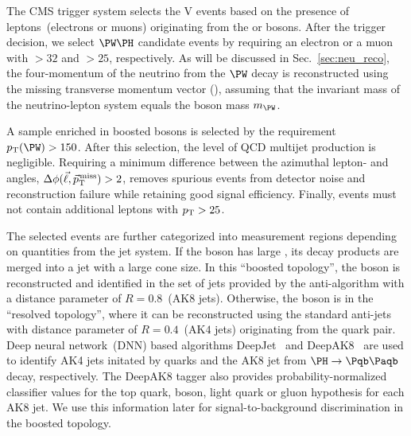 \documentclass[a4paper,11pt]{article}
\newcommand{\Pb}{{{\Pqb}}\xspace}
\newcommand{\PAb}{{{{\Paqb}}}\xspace}
\renewcommand{\PV}{{{{V}}}\xspace}
\newcommand{\VH}{{{\PV}{\PH}}\xspace}
\begin{document}
The CMS trigger system selects the \VH events based on the presence of leptons~(electrons or muons) originating from the \PW or \PZ bosons.
After the trigger decision, we select $\PW\PH$ candidate events by requiring an electron or a muon with \pt$>32$ and $>25$\GeV, respectively. 
As will be discussed in Sec.~\ref{sec:neu_reco}, the four-momentum of the neutrino from the $\PW$ decay is reconstructed using the missing transverse momentum vector (\ptvecmiss), assuming that the invariant mass of the neutrino-lepton system equals the \PW boson mass $m_{\PW}$.

A sample enriched in boosted \PW bosons is selected by the requirement $\pt(\PW) > 150$\GeV. 
After this selection, the level of QCD multijet production is negligible.
Requiring a minimum difference between the azimuthal lepton- and \ptmiss angles, $\Delta\phi(\vec{\ell},{\vec p}_{\mathrm{T}}^{\kern1pt\text{miss}})>2$, removes spurious events from detector noise and reconstruction failure while retaining good signal efficiency.
Finally, %
events must not contain additional leptons with $p_{\mathrm{T}}>25$\GeV.

The selected events are further categorized into measurement regions depending on quantities from the jet system. 
If the \PH boson has large \pt, its decay products are merged into a jet with a large cone size. 
In this ``boosted topology'', the \PH boson is reconstructed and identified in the set of jets provided by the anti-\kt algorithm with a distance parameter of $R=0.8$~(AK8 jets).
Otherwise, the \PH boson is in the ``resolved topology'', 
where it can be reconstructed using the standard anti-\kt jets with distance parameter of $R=0.4$~(AK$4$ jets) originating from the \Pb quark pair. 
Deep neural network~(DNN) based algorithms DeepJet~\cite{Bols:2020bkb} and DeepAK8~\cite{Sirunyan:2020lcu} are used to identify AK4 jets initated by \Pb quarks and the AK8 jet from $\PH \rightarrow \Pb \PAb$ decay, respectively.
The DeepAK8 tagger also provides probability-normalized classifier values for the top quark, \PW boson, light quark or gluon hypothesis for each AK8 jet. 
We use this information later for signal-to-background discrimination in the boosted topology. %
\end{document}
